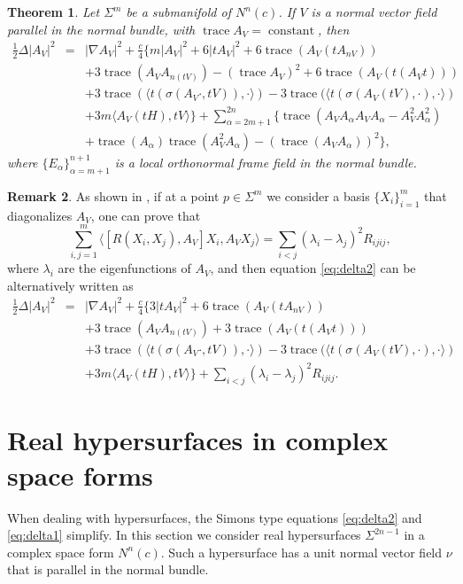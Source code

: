 \documentclass[11pt]{amsart}
\theoremstyle{plain}
\newtheorem{theorem}                {Theorem}      [section]
\theoremstyle{definition}
\newtheorem{remark}       [theorem]  {Remark}
\DeclareMathOperator{\trace}{trace} \DeclareMathOperator{\di}{div}
\DeclareMathOperator{\cst}{constant}
\numberwithin{equation}{section}
\begin{document}
\begin{theorem}\label{p:delta} Let $\Sigma^m$ be a submanifold of $N^n(c)$. If $V$ is a normal vector field parallel in the normal bundle, with $\trace A_V=\cst$, then
\begin{eqnarray}\label{eq:delta2}
\frac{1}{2}\Delta|A_V|^2&=&|\nabla A_V|^2+\frac{c}{4}\{m|A_V|^2+6|tA_V|^2+6\trace(A_V(tA_{nV}))\\\nonumber &&+3\trace(A_VA_{n(tV)})-(\trace A_V)^2+6\trace(A_V(t(A_Vt)))\\\nonumber &&+3\trace(\langle t(\sigma(A_V\cdot,tV)),\cdot\rangle)-3\trace(\langle t(\sigma(A_V(tV),\cdot),\cdot\rangle)\\\nonumber &&+3m\langle A_V(tH),tV\rangle\}+\sum_{\alpha=2m+1}^{2n}\{\trace(A_VA_{\alpha}A_VA_{\alpha}-A_V^2A_{\alpha}^2)\\\nonumber &&+\trace(A_{\alpha})\trace(A_V^2A_{\alpha})-(\trace(A_VA_{\alpha}))^2\},
\end{eqnarray}
where $\{E_{\alpha}\}_{\alpha=m+1}^{n+1}$ is a local orthonormal frame field in the normal bundle.
\end{theorem}

\begin{remark} As shown in \cite[Section 1]{NS}, if at a point $p\in\Sigma^m$ we consider a basis $\{X_i\}_{i=1}^{m}$ that diagonalizes $A_V$, one can prove that
$$
\sum_{i,j=1}^m\langle[R(X_i,X_j),A_V]X_i,A_VX_j\rangle=\sum_{i<j}(\lambda_i-\lambda_j)^2R_{ijij},
$$
where $\lambda_i$ are the eigenfunctions of $A_V$, and then equation \eqref{eq:delta2} can be alternatively written as
\begin{eqnarray}\label{eq:delta1}
\frac{1}{2}\Delta|A_V|^2&=&|\nabla A_V|^2+\frac{c}{4}\{3|tA_V|^2+6\trace(A_V(tA_{nV}))\\\nonumber &&+3\trace(A_VA_{n(tV)})+3\trace(A_V(t(A_Vt)))\\\nonumber &&+3\trace(\langle t(\sigma(A_V\cdot,tV)),\cdot\rangle)-3\trace(\langle t(\sigma(A_V(tV),\cdot),\cdot\rangle)\\\nonumber &&+3m\langle A_V(tH),tV\rangle\}+\sum_{i<j}(\lambda_i-\lambda_j)^2R_{ijij}.
\end{eqnarray}
\end{remark}

\section{Real hypersurfaces in complex space forms}

When dealing with hypersurfaces, the Simons type equations \eqref{eq:delta2} and \eqref{eq:delta1} simplify. In this section we consider real hypersurfaces $\Sigma^{2n-1}$ in a complex space form $N^n(c)$. Such a hypersurface has a unit normal vector field $\nu$ that is parallel in the normal bundle. 
\end{document}
